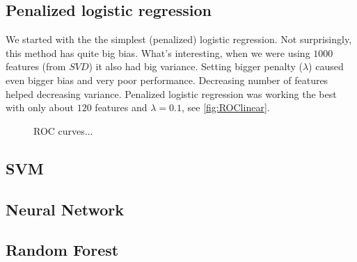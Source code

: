 \documentclass[]{article}
\begin{document}
\subsection{Penalized logistic regression}
We started with the the simplest (penalized) logistic regression. Not surprisingly, this method has quite big bias. What's interesting, when we were using $1000$ features (from $SVD$) it also had big variance. Setting bigger penalty ($\lambda$) caused even bigger bias and very poor performance. Decreasing number of features helped decreasing variance. Penalized logistic regression was working the best with only about $120$ features and $\lambda = 0.1$, see \ref{fig:ROClinear}.
  \begin{figure}[!h]
    \center
    \caption{ROC curves...}
  \end{figure}

\subsection{SVM}

\subsection{Neural Network}

\subsection{Random Forest}
\end{document}
